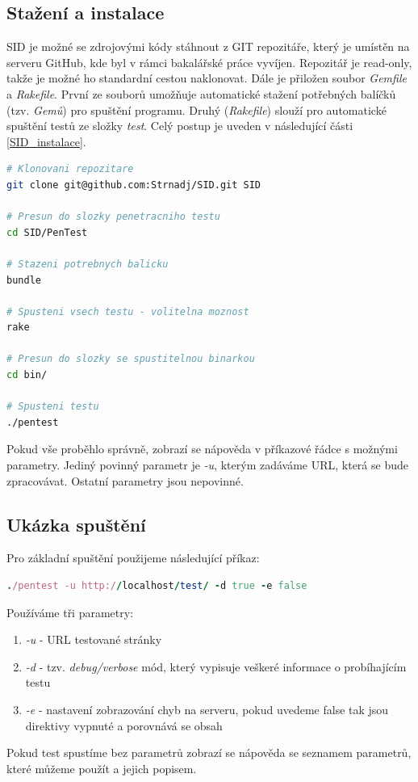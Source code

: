 \subsection{Stažení a instalace}
SID je možné se zdrojovými kódy stáhnout z GIT repozitáře, který je umístěn na serveru GitHub, kde byl v rámci bakalářské práce vyvíjen. Repozitář je read-only, takže je možné ho standardní cestou naklonovat. Dále je přiložen soubor \textit{Gemfile} a \textit{Rakefile}. První ze souborů umožňuje automatické stažení potřebných balíčků (tzv. \textit{Gemů}) pro spuštění programu. Druhý (\textit{Rakefile}) slouží pro automatické spuštění testů ze složky \textit{test}. Celý postup je uveden v následující části \ref{SID_instalace}.
\begin{lstlisting}[label=SID_instalace,language=Bash, caption=Instalace]
# Klonovani repozitare
git clone git@github.com:Strnadj/SID.git SID

# Presun do slozky penetracniho testu
cd SID/PenTest

# Stazeni potrebnych balicku
bundle

# Spusteni vsech testu - volitelna moznost
rake

# Presun do slozky se spustitelnou binarkou
cd bin/

# Spusteni testu
./pentest 

\end{lstlisting}
Pokud vše proběhlo správně, zobrazí se nápověda v příkazové řádce s možnými parametry. Jediný povinný parametr je \textit{-u}, kterým zadáváme URL, která se bude zpracovávat. Ostatní parametry jsou nepovinné.

\subsection{Ukázka spuštění}
Pro základní spuštění použijeme následující příkaz:
\begin{lstlisting}[label=SID_run,language=Ruby, caption=Spuštění testu]
./pentest -u http://localhost/test/ -d true -e false
\end{lstlisting}
Používáme tři parametry:
\begin{enumerate}
\item \textit{-u} - URL testované stránky
\item \textit{-d} - tzv. \textit{debug/verbose} mód, který vypisuje veškeré informace o probíhajícím testu
\item \textit{-e} - nastavení zobrazování chyb na serveru, pokud uvedeme false tak jsou direktivy vypnuté a porovnává se obsah
\end{enumerate}
Pokud test spustíme bez parametrů zobrazí se nápověda se seznamem parametrů, které můžeme použít a jejich popisem.

